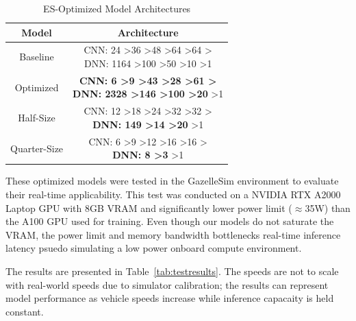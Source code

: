 \documentclass[conference]{IEEEtran}
\begin{document}
\newcommand{\gr}{\textgreater}

\begin{table}[ht]
    \centering
    \caption{ES-Optimized Model Architectures}
    \begin{tabular}{c|c}

        \textbf{Model} & \textbf{Architecture}                                       \\
        \hline
        Baseline       & \makecell[l]{CNN: 24 \gr 36 \gr 48 \gr 64 \gr 64 \gr        \\
        DNN: 1164 \gr 100 \gr 50 \gr 10 \gr 1}                                       \\
        \hline
        Optimized      & \makecell[l]{\textbf{CNN: 6 \gr 9 \gr 43 \gr 28 \gr 61 \gr} \\
        \textbf{DNN: 2328 \gr 146 \gr 100 \gr 20} \gr 1}                             \\
        \hline
        Half-Size      & \makecell[l]{CNN: 12 \gr 18 \gr 24 \gr 32 \gr 32 \gr        \\
        \textbf{DNN: 149 \gr 14 \gr 20} \gr 1}                                       \\
        \hline
        Quarter-Size   & \makecell[l]{CNN: 6 \gr 9 \gr 12 \gr 16 \gr 16 \gr          \\
        \textbf{DNN: 8 \gr 3} \gr 1}                                                 \\
    \end{tabular}
    \label{tab:testarch}
\end{table}

These optimized models were tested in the GazelleSim environment to evaluate their real-time applicability. This test was conducted on a NVIDIA RTX A2000 Laptop GPU with 8GB VRAM and significantly lower power limit (\(\approx{}\)35W) than the A100 GPU used for training. Even though our models do not saturate the VRAM, the power limit and memory bandwidth bottlenecks real-time inference latency psuedo simulating a low power onboard compute environment.

The results are presented in Table~\ref{tab:testresults}. The speeds are not to scale with real-world speeds due to simulator calibration; the results can represent model performance as vehicle speeds increase while inference capacaity is held constant.
\end{document}
